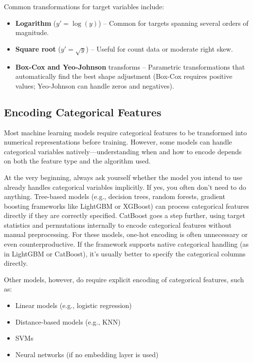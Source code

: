 \documentclass[12pt,openany]{book}
\begin{document}
Common transformations for target variables include:
\begin{itemize}
    \item \textbf{Logarithm} (\(y' = \log(y)\)) – Common for targets spanning several orders of magnitude.
    \item \textbf{Square root} (\(y' = \sqrt{y}\)) – Useful for count data or moderate right skew.
    \item \textbf{Box-Cox and Yeo-Johnson} transforms – Parametric transformations that automatically find the best shape adjustment (Box-Cox requires positive values; Yeo-Johnson can handle zeros and negatives).
\end{itemize}


\subsection{Encoding Categorical Features}

Most machine learning models require categorical features to be transformed into numerical representations before training. However, some models can handle categorical variables natively—understanding when and how to encode depends on both the feature type and the algorithm used. \newline

At the very beginning, always ask yourself whether the model you intend to use already handles categorical variables implicitly. If yes, you often don’t need to do anything. Tree-based models (e.g., decision trees, random forests, gradient boosting frameworks like LightGBM or XGBoost) can process categorical features directly if they are correctly specified. CatBoost goes a step further, using target statistics and permutations internally to encode categorical features without manual preprocessing. For these models, one-hot encoding is often unnecessary or even counterproductive. If the framework supports native categorical handling (as in LightGBM or CatBoost), it’s usually better to specify the categorical columns directly. \newline

Other models, however, do require explicit encoding of categorical features, such as:
\begin{itemize}
    \item Linear models (e.g., logistic regression)
    \item Distance-based models (e.g., KNN)
    \item SVMs
    \item Neural networks (if no embedding layer is used)
\end{itemize}
\end{document}
